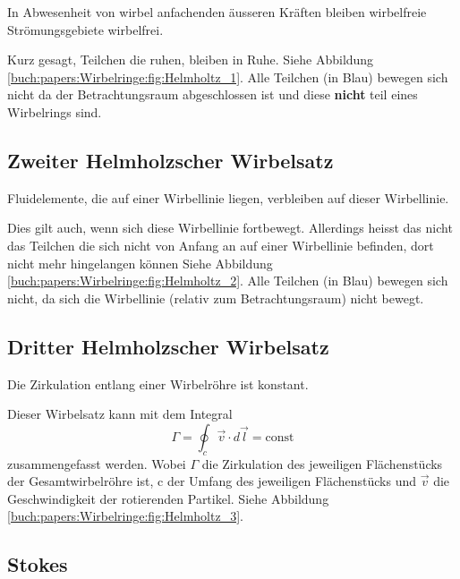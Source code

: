 \begin{displayquote}
    In Abwesenheit von wirbel anfachenden äusseren Kräften bleiben wirbelfreie Strömungsgebiete wirbelfrei.
\end{displayquote}

Kurz gesagt, Teilchen die ruhen, bleiben in Ruhe. 
Siehe Abbildung \ref{buch:papers:Wirbelringe:fig:Helmholtz_1}. 
Alle Teilchen (in Blau) bewegen sich nicht da der Betrachtungsraum abgeschlossen ist und diese \textbf{nicht} teil eines Wirbelrings sind.

\subsection{Zweiter Helmholzscher Wirbelsatz}

\begin{displayquote}
    Fluidelemente, die auf einer Wirbellinie liegen, verbleiben auf dieser Wirbellinie.
\end{displayquote}

Dies gilt auch, wenn sich diese Wirbellinie fortbewegt. 
Allerdings heisst das nicht das Teilchen die sich nicht von Anfang an auf einer Wirbellinie befinden, dort nicht mehr hingelangen können  
Siehe Abbildung \ref{buch:papers:Wirbelringe:fig:Helmholtz_2}. 
Alle Teilchen (in Blau) bewegen sich nicht, da sich die Wirbellinie (relativ zum Betrachtungsraum) nicht bewegt.

\subsection{Dritter Helmholzscher Wirbelsatz}

\begin{displayquote}
    Die Zirkulation entlang einer Wirbelröhre ist konstant. 
\end{displayquote}

Dieser Wirbelsatz kann mit dem Integral 
\[
\Gamma
= 
\oint_{c} \vec{v} \cdot d \vec{l}
=
\text{const}
\]
zusammengefasst werden. 
Wobei \(\Gamma\) die Zirkulation des jeweiligen Flächenstücks der Gesamtwirbelröhre ist, c der Umfang des jeweiligen Flächenstücks und \(\vec{v}\) die Geschwindigkeit der rotierenden Partikel. 
Siehe Abbildung \ref{buch:papers:Wirbelringe:fig:Helmholtz_3}. 


\subsection{Stokes}

